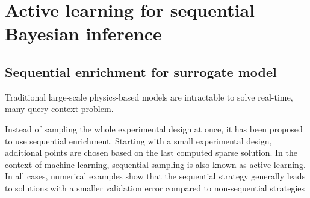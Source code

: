 \chapter{Active learning for sequential Bayesian inference}


\section{Sequential enrichment for surrogate model}

Traditional large-scale physics-based models are intractable to solve real-time, many-query context problem. 


Instead of sampling the whole experimental design at once, it has been proposed to use sequential enrichment. Starting with
a small experimental design, additional points are chosen based on the last computed sparse
solution. In the context of machine learning, sequential sampling is also known as active learning.  In all cases, numerical examples show that the sequential strategy generally leads to solutions with
a smaller validation error compared to non-sequential strategies

